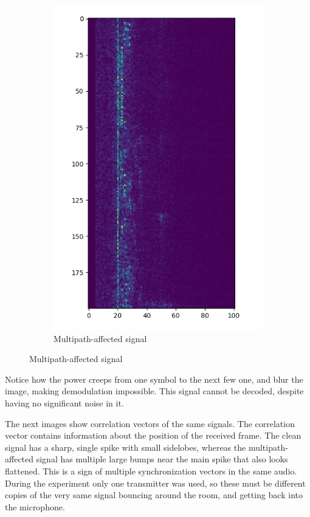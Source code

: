 \documentclass[a4paper]{article}
\begin{document}
\begin{figure}[H]
\begin{subfigure}{0.45\textwidth}
        \includegraphics[width=1\textwidth]{waterfall_sync_multipath.png}
        \caption{Multipath-affected signal}
    \end{subfigure}
\end{figure}

Notice how the power creeps from one symbol to the next few one, and
blur the image, making demodulation impossible. This signal cannot be
decoded, despite having no significant noise in it.

The next images show correlation vectors of the same signals. The
correlation vector contains information about the position of the
received frame. The clean signal has a sharp, single spike with small
sidelobes, whereas the multipath-affected signal has multiple large
bumps near the main spike that also looks flattened. This is a sign of
multiple synchronization vectors in the same audio. During the
experiment only one transmitter was used, so these must be different
copies of the very same signal bouncing around the room, and getting
back into the microphone.
\end{document}
